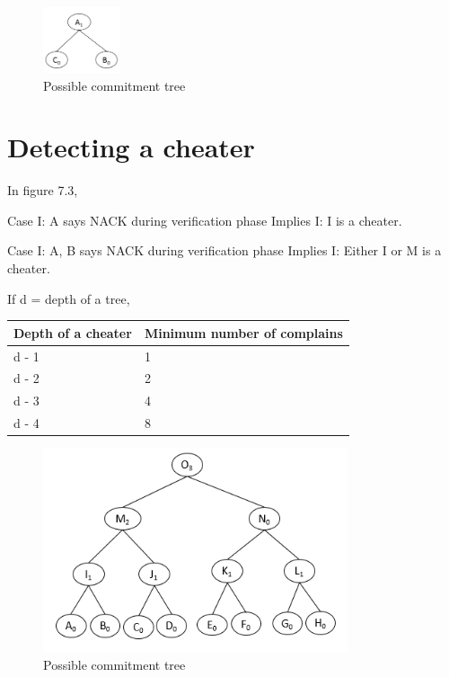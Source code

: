 	\begin{figure}[t]
		\centering
			\includegraphics[width=0.2\textwidth]{commitment_tree_2.png}
			\caption{Possible commitment tree}
		\label{fig:figure2}
	\end{figure}

\section{Detecting a cheater}
	
	In figure 7.3,

	Case I: A says NACK during verification phase
	Implies I: I is a cheater.

	Case I: A, B says NACK during verification phase
	Implies I: Either I or M is a cheater. 
	

	If d = depth of a tree,\\

	\begin{tabular}{| l | l |}
    \hline
    Depth of a cheater & Minimum number of complains \\ \hline
    d - 1 & 1 \\ \hline
    d - 2 & 2 \\ \hline
    d - 3 & 4 \\ \hline
    d - 4 & 8 \\ \hline
    \end{tabular}

	\begin{figure}[t]
		\centering
			\includegraphics[width=0.8\textwidth]{commitment_tree_3.png}
			\caption{Possible commitment tree}
		\label{fig:figure2}
	\end{figure}